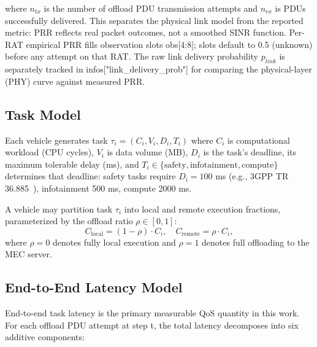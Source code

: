 where $n_{tx}$ is the number of offload PDU transmission attempts and $n_{rx}$ is PDUs successfully delivered. This separates the physical link model from the reported metric: PRR reflects real packet outcomes, not a smoothed SINR function. Per-RAT empirical PRR fills observation slots obs[4:8]; slots default to 0.5 (unknown) before any attempt on that RAT. The raw link delivery probability $p_{link}$ is separately tracked in infos["link\_delivery\_prob"] for comparing the physical-layer (PHY) curve against measured PRR.

\subsection{Task Model}

Each vehicle generates task $\tau_i = (C_i, V_i, D_i, T_i)$ where $C_i$ is computational workload (CPU cycles), $V_i$ is data volume (MB), $D_i$ is the task's deadline, its maximum tolerable delay (ms), and $T_i \in \{\text{safety}, \text{infotainment}, \text{compute}\}$ determines that deadline: safety tasks require $D_i = 100$ ms (e.g., 3GPP TR 36.885~\cite{molina2017}), infotainment 500 ms, compute 2000 ms.

A vehicle may partition task $\tau_i$ into local and remote execution fractions, parameterized by the offload ratio $\rho \in [0, 1]$:
\begin{equation}
\label{eq:offload_ratio}
C_{\text{local}} = (1 - \rho) \cdot C_i, \quad C_{\text{remote}} = \rho \cdot C_i,
\end{equation}
where $\rho = 0$ denotes fully local execution and $\rho = 1$ denotes full offloading to the MEC server.

\subsection{End-to-End Latency Model}

End-to-end task latency is the primary measurable QoS quantity in this work. For each offload PDU attempt at step t, the total latency decomposes into six additive components:

